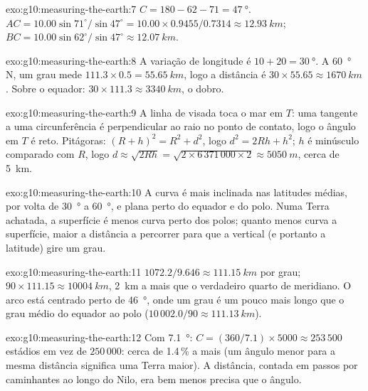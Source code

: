 \begin{solution}{exo:g10:measuring-the-earth:7}
$C = 180 - 62 - 71 = \qty{47}{\degree}$.
$AC = 10.00 \sin 71^\circ/\sin 47^\circ = 10.00 \times 0.9455/0.7314 \approx
\qty{12.93}{km}$; $BC = 10.00 \sin 62^\circ/\sin 47^\circ \approx
\qty{12.07}{km}$.
\end{solution}

\begin{solution}{exo:g10:measuring-the-earth:8}
A variação de longitude é $10 + 20 = \qty{30}{\degree}$. A
\qty{60}{\degree} N, um grau mede $111.3 \times 0.5 = \qty{55.65}{km}$, logo
a distância é $30 \times 55.65 \approx \qty{1670}{km}$. Sobre o equador:
$30 \times 111.3 \approx \qty{3340}{km}$, o dobro.
\end{solution}

\begin{solution}{exo:g10:measuring-the-earth:9}
A linha de visada toca o mar em $T$: uma tangente a uma circunferência é
perpendicular ao raio no ponto de contato, logo o ângulo em $T$ é reto.
Pitágoras: $(R+h)^2 = R^2 + d^2$, logo $d^2 = 2Rh + h^2$; $h$ é minúsculo
comparado com $R$, logo $d \approx \sqrt{2Rh} = \sqrt{2 \times
6\,371\,000 \times 2} \approx \qty{5050}{m}$, cerca de \qty{5}{km}.
\end{solution}

\begin{solution}{exo:g10:measuring-the-earth:10}
A curva é mais inclinada nas latitudes médias, por volta de
\qty{30}{\degree} a \qty{60}{\degree}, e plana perto do equador e do polo.
Numa Terra achatada, a superfície é menos curva perto dos polos; quanto
menos curva a superfície, maior a distância a percorrer para que a vertical
(e portanto a latitude) gire um grau.
\end{solution}

\begin{solution}{exo:g10:measuring-the-earth:11}
$1072.2/9.646 \approx \qty{111.15}{km}$ por grau; $90 \times 111.15
\approx \qty{10004}{km}$, \qty{2}{km} a mais que o verdadeiro quarto de
meridiano. O arco está centrado perto de \qty{46}{\degree}, onde um grau é
um pouco mais longo que o grau médio do equador ao polo
($10\,002.0/90 \approx \qty{111.13}{km}$).
\end{solution}

\begin{solution}{exo:g10:measuring-the-earth:12}
Com \qty{7.1}{\degree}: $C = (360/7.1) \times 5000 \approx 253\,500$
estádios em vez de $250\,000$: cerca de 1.4\,\% a mais (um ângulo menor
para a mesma distância significa uma Terra maior). A distância, contada em
passos por caminhantes ao longo do Nilo, era bem menos precisa que o
ângulo.
\end{solution}

